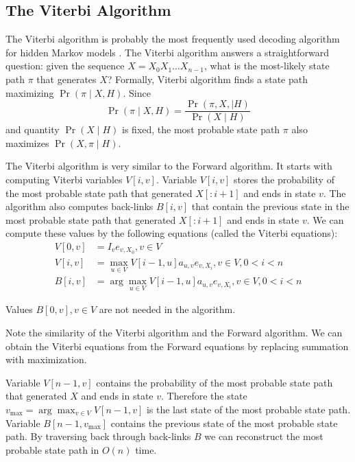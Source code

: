 \subsection{The Viterbi Algorithm}\label{SECTION:VITERBI}
The Viterbi algorithm  is probably the most frequently used
decoding algorithm for hidden Markov
models \cite{Durbin1998}.
The Viterbi algorithm answers a straightforward question: given the sequence
$X=X_0X_1\dots X_{n-1}$, what
is the most-likely state path $\pi$ that generates $X$? Formally, Viterbi
algorithm finds a state path maximizing $\Pr\left( \pi\mid X,H \right)$. Since
\[\Pr\left(\pi\mid X,H\right) = \frac{\Pr\left(\pi,X,\mid
H\right)}{\Pr\left(X\mid H\right)}\] and quantity $\Pr\left(X\mid H\right)$ is
fixed, the most probable state path $\pi$ also maximizes $\Pr\left(X,\pi\mid H\right)$. 

The Viterbi algorithm is very similar to the  Forward algorithm. It starts with computing
Viterbi variables $V[i,v]$. Variable $V[i,v]$ stores the probability of the most probable 
state path that generated $X[:i+1]$ and ends in state $v$. The algorithm
also computes back-links $B[i,v]$ that contain the previous state in the most
probable state path that generated $X[:i+1]$ and ends in state $v$. We can
compute these values by the following equations (called the Viterbi equations):
\begin{align}
V[0,v] &= I_{v}e_{v,X_0}, v\in V\\
V[i,v] &= \max_{u\in V} V[i-1,u]a_{u,v}e_{v,X_i}, v\in V,0<i<n\\
B[i,v] &= \arg\max_{u\in V} V[i-1,u]a_{u,v}e_{v,X_i}, v\in V,0<i<n
\end{align}
\begin{note}
Values $B[0,v],v\in V$ are not needed in the algorithm.

Note the similarity of the Viterbi algorithm and the Forward algorithm.
We can obtain the Viterbi equations from the Forward equations by replacing
summation with
maximization.
\end{note}


Variable $V[n-1,v]$ contains the probability of the most probable state path
that generated $X$ and ends in state $v$. Therefore the state $v_{\max} =
\arg\max_{v\in V}V[n-1,v]$ is the last state of the most probable state path.
Variable $B[n-1,v_{\max}]$ contains the previous state of the most probable
state path. By traversing back through back-links $B$ we can reconstruct the most
probable state path in $O(n)$ time.

